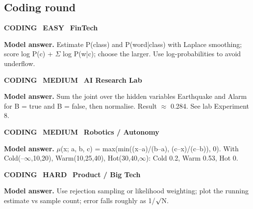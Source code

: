 \documentclass[11pt]{article}
\begin{document}
\subsection*{\color{navyL}Coding round}
\begin{tcolorbox}[enhanced,breakable,colback=white,colframe=navyL,arc=2mm,boxrule=0.8pt,left=3mm,right=3mm,
 title={\textbf{QIV.06}\quad Implement Na\"{i}ve Bayes for spam detection from word counts.},fonttitle=\color{white}\small,colbacktitle=navyL]
\colorbox{navyL!15}{\scriptsize\bfseries\color{navyL} CODING}\
\colorbox{leaf!15}{\scriptsize\bfseries\color{leaf} EASY}\
\colorbox{navy!8}{\scriptsize\bfseries\color{navy} FinTech}\par\smallskip
\textbf{\color{navy}Model answer.} Estimate P(class) and P(word|class) with Laplace smoothing; score log P(c) + $\Sigma$ log P(w|c); choose the larger. Use log-probabilities to avoid underflow.
\end{tcolorbox}
\begin{tcolorbox}[enhanced,breakable,colback=white,colframe=navyL,arc=2mm,boxrule=0.8pt,left=3mm,right=3mm,
 title={\textbf{QIV.07}\quad Compute P(Burglary | JohnCalls, MaryCalls) by enumeration.},fonttitle=\color{white}\small,colbacktitle=navyL]
\colorbox{navyL!15}{\scriptsize\bfseries\color{navyL} CODING}\
\colorbox{gold!85!black!15}{\scriptsize\bfseries\color{gold!85!black} MEDIUM}\
\colorbox{navy!8}{\scriptsize\bfseries\color{navy} AI Research Lab}\par\smallskip
\textbf{\color{navy}Model answer.} Sum the joint over the hidden variables Earthquake and Alarm for B = true and B = false, then normalise. Result $\approx$ 0.284. See lab Experiment 8.
\end{tcolorbox}
\begin{tcolorbox}[enhanced,breakable,colback=white,colframe=navyL,arc=2mm,boxrule=0.8pt,left=3mm,right=3mm,
 title={\textbf{QIV.08}\quad Write a triangular membership function and fuzzify 18 $^\circ$C into Cold/Warm/Hot.},fonttitle=\color{white}\small,colbacktitle=navyL]
\colorbox{navyL!15}{\scriptsize\bfseries\color{navyL} CODING}\
\colorbox{gold!85!black!15}{\scriptsize\bfseries\color{gold!85!black} MEDIUM}\
\colorbox{navy!8}{\scriptsize\bfseries\color{navy} Robotics / Autonomy}\par\smallskip
\textbf{\color{navy}Model answer.} $\mu$(x; a, b, c) = max(min((x--a)/(b--a), (c--x)/(c--b)), 0). With Cold(--$\infty$,10,20), Warm(10,25,40), Hot(30,40,$\infty$): Cold 0.2, Warm 0.53, Hot 0.
\end{tcolorbox}
\begin{tcolorbox}[enhanced,breakable,colback=white,colframe=navyL,arc=2mm,boxrule=0.8pt,left=3mm,right=3mm,
 title={\textbf{QIV.09}\quad Simulate a Monte-Carlo estimate of a posterior and show its convergence.},fonttitle=\color{white}\small,colbacktitle=navyL]
\colorbox{navyL!15}{\scriptsize\bfseries\color{navyL} CODING}\
\colorbox{crimson!15}{\scriptsize\bfseries\color{crimson} HARD}\
\colorbox{navy!8}{\scriptsize\bfseries\color{navy} Product / Big Tech}\par\smallskip
\textbf{\color{navy}Model answer.} Use rejection sampling or likelihood weighting; plot the running estimate vs sample count; error falls roughly as 1/$\surd$N.
\end{tcolorbox}
\end{document}
